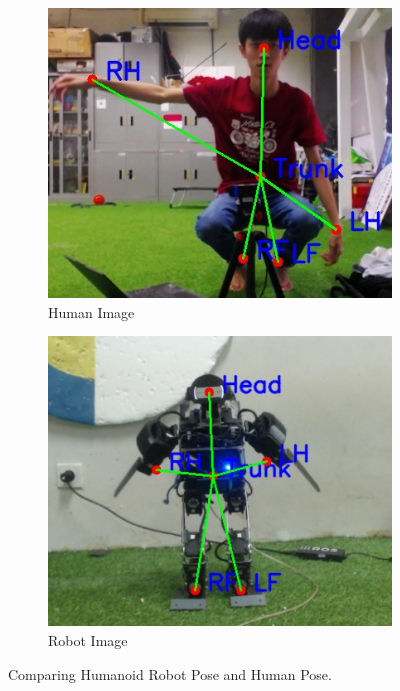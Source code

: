 \begin{figure}
  \centering
  \begin{subfigure}[b]{0.45\textwidth}
      \centering
      \includegraphics[width=\textwidth]{gambar/human_10_result.jpg}
      \caption{Human Image}
      \label{fig:humanimagea}
  \end{subfigure}
  \hfill
  \begin{subfigure}[b]{0.45\textwidth}
      \centering
      \includegraphics[width=\textwidth]{gambar/robot_6_result.jpg}
      \caption{Robot Image}
      \label{fig:robotimagea}
  \end{subfigure}
     \caption{Comparing Humanoid Robot Pose and Human Pose.}
     \label{fig:comparinga}
\end{figure}

